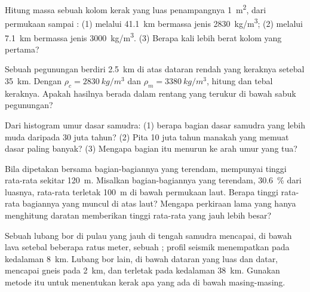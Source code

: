 \begin{exercise}[$\star\star$]\label{exo:g12:continental-crust:7}
Hitung massa sebuah kolom kerak yang luas penampangnya \qty{1}{m^2}, dari
permukaan sampai : (1) melalui \qty{41.1}{km}  bermassa jenis
\qty{2830}{kg/m^3}; (2) melalui \qty{7.1}{km}  bermassa jenis
\qty{3000}{kg/m^3}. (3) Berapa kali lebih berat kolom yang pertama?
\end{exercise}

\begin{exercise}[$\star\star$]\label{exo:g12:continental-crust:8}
Sebuah pegunungan berdiri \qty{2.5}{km} di atas dataran rendah yang keraknya
setebal \qty{35}{km}. Dengan $\rho_c = \qty{2830}{kg/m^3}$ dan $\rho_m =
\qty{3380}{kg/m^3}$, hitung  dan tebal keraknya. Apakah hasilnya berada
dalam rentang yang terukur di bawah sabuk pegunungan?
\end{exercise}

\begin{exercise}[$\star\star$]\label{exo:g12:continental-crust:9}
Dari histogram umur dasar samudra: (1) berapa bagian dasar samudra yang lebih
muda daripada 30 juta tahun? (2) Pita 10 juta tahun manakah yang memuat dasar
paling banyak? (3) Mengapa bagian itu menurun ke arah umur yang tua?
\end{exercise}

\begin{exercise}[$\star\star$]\label{exo:g12:continental-crust:10}
Bila dipetakan bersama bagian-bagiannya yang terendam,  mempunyai
tinggi rata-rata sekitar \qty{120}{m}. Misalkan bagian-bagiannya yang terendam,
\qty{30.6}{\percent} dari luasnya, rata-rata terletak \qty{100}{m} di bawah
permukaan laut. Berapa tinggi rata-rata bagiannya yang muncul di atas laut?
Mengapa perkiraan lama yang hanya menghitung daratan memberikan tinggi rata-rata
yang jauh lebih besar?
\end{exercise}

\begin{exercise}[$\star\star$]\label{exo:g12:continental-crust:11}
Sebuah lubang bor di pulau yang jauh di tengah samudra mencapai, di bawah lava
setebal beberapa ratus meter, sebuah ; profil seismik menempatkan 
pada kedalaman \qty{8}{km}. Lubang bor lain, di bawah dataran yang luas dan
datar, mencapai gneis pada \qty{2}{km}, dan  terletak pada kedalaman
\qty{38}{km}. Gunakan metode itu untuk menentukan kerak apa yang ada di bawah
masing-masing.
\end{exercise}

